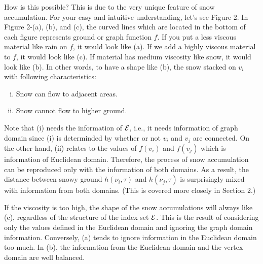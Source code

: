 \documentclass[preprint, review, 12pt]{article}
\theoremstyle{definition}
\theoremstyle{remark}
\begin{document}
How is this possible? This is due to the very unique feature of snow accumulation. For your easy and intuitive understanding, let's see Figure 2. In Figure 2-(a), (b), and (c), the curved lines which are located in the bottom of each figure represents ground or graph function $f$. If you put a less viscous material like rain on $f$, it would look like (a). If we add a highly viscous material to $f$, it would look like (c). If material has medium viscosity like snow, it would look like (b). In other words, to have a shape like (b), the snow stacked on $v_i$ with following characteristics: 
\begin{enumerate}[(i)]
\item Snow can flow to adjacent areas.
\item Snow cannot flow to higher ground. 
\end{enumerate}
Note that (i) needs the information of ${\cal E}$, i.e., it needs information of graph domain since (i) is determinded by whether or not $v_i$ and $v_j$ are connected.  On the other hand, (ii) relates to the values of $f(v_i)$ and $f (v_j)$ which is information of Euclidean domain. Therefore, the process of snow accumulation can be reproduced only with the information of both domains. As a result, the distance between snowy ground $h(\nu_i,\tau)$ and $h(\nu_j,\tau)$ is surprisingly mixed with information from both domains. (This is covered more closely in Section 2.)

If the viscosity is too high, the shape of the snow accumulations will always like (c), regardless of the structure of the index set ${\cal E}$. This is the result of considering only the values defined in the Euclidean domain and ignoring the graph domain information. Conversely, (a) tends to ignore information in the Euclidean domain too much. In (b), the information from the Euclidean domain and the vertex domain are well balanced.
\end{document}
